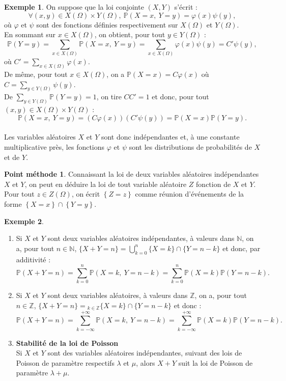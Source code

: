 \documentclass[french]{article}
\renewcommand{\P}{\mathbb{P}}
\newcommand{\N}{\mathbb{N}}
\newcommand{\Z}{\mathbb{Z}}
\theoremstyle{plain}
\theoremstyle{definition}
\newtheorem*{ex}{Exemple}
\newtheorem*{met}{Point méthode}
\theoremstyle{remark}
\begin{document}
\begin{ex}
	On suppose que la loi conjointe $(X,Y)$ s'écrit :
	$$\forall (x,y)\in X(\Omega)\times Y(\Omega),\ \P(X=x,\ Y=y)=\varphi(x)\psi(y),$$ où $\varphi$ et $\psi$ sont des fonctions définies respectivement sur $X(\Omega)$ et $Y(\Omega)$. \\
	En sommant sur $x\in X(\Omega)$, on obtient, pour tout $y\in Y(\Omega)$ : $$\P(Y=y)=\sum_{x\in X(\Omega)}\P(X=x,\ Y=y)=\sum_{x\in X(\Omega)}\varphi(x)\psi(y)=C'\psi(y),$$ où $C'=\displaystyle\sum_{x\in X(\Omega)}\varphi(x)$.\\
	De même, pour tout $x\in X(\Omega)$, on a $\P(X=x)=C\varphi(x)$ où $C=\displaystyle\sum_{y\in Y(\Omega)}\psi(y)$. \\
	De $\displaystyle\sum_{y\in Y(\Omega)}\P(Y=y)=1$, on tire $CC'=1$ et donc, pour tout $(x,y)\in X(\Omega)\times Y(\Omega)$ :
	$$\P(X=x,\ Y=y)=(C\varphi(x))(C'\psi(y))=\P(X=x)\P(Y=y).$$
	\\
	Les variables aléatoires $X$ et $Y$ sont donc indépendantes et, à une constante multiplicative près, les fonctions $\varphi$ et $\psi$ sont les distributions de probabilités de $X$ et de $Y$.
\end{ex}

\begin{met}
	Connaissant la loi de deux variables aléatoires indépendantes $X$ et $Y$, on peut en déduire la loi de tout variable aléatoire $Z$ fonction de $X$ et $Y$. Pour tout $z\in Z(\Omega)$, on écrit $\left\{Z=z\right\}$ comme réunion d'événements de la forme $\left\{X=x\right\}\cap\left\{Y=y\right\}$.
\end{met}

\begin{ex}
	\begin{enumerate}
		\item Si $X$ et $Y$ sont deux variables aléatoires indépendantes, à valeurs dans $\N$, on a, pour tout $n\in\N$, $\{X+Y=n\}=\displaystyle\bigcup_{k=0}^n\{X=k\}\cap\{Y=n-k\}$ et donc, par additivité :
		$$\P(X+Y=n)=\sum_{k=0}^{n}\P(X=k,\ Y=n-k)=\sum_{k=0}^{n}\P(X=k)\P(Y=n-k).$$
		\item Si $X$ et $Y$ sont deux variables aléatoires, à valeurs dans $\Z$, on a, pour tout $n\in\Z$, $\{X+Y=n\}=\displaystyle_{k\in\Z}\{X=k\}\cap\{Y=n-k\}$ et donc :
		$$\P(X+Y=n)=\sum_{k=-\infty}^{+\infty}\P(X=k,\ Y=n-k)=\sum_{k=-\infty}^{+\infty}\P(X=k)\P(Y=n-k).$$
		\item \textbf{Stabilité de la loi de Poisson}\\
		Si $X$ et $Y$ sont des variables aléatoires indépendantes, suivant des lois de Poisson de paramètre respectifs $\lambda$ et $\mu$, alors $X+Y$ suit la loi de Poisson de paramètre $\lambda+\mu$.
	\end{enumerate}
\end{ex}
\end{document}
